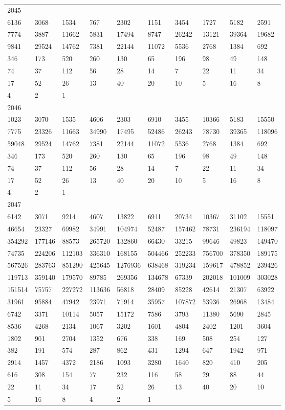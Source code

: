\begin{longtable}{*{10}{l}}
2045&&&&&&&&&\\
6136& 3068& 1534& 767& 2302& 1151& 3454& 1727& 5182& 2591\\
7774& 3887& 11662& 5831& 17494& 8747& 26242& 13121& 39364& 19682\\
9841& 29524& 14762& 7381& 22144& 11072& 5536& 2768& 1384& 692\\
346& 173& 520& 260& 130& 65& 196& 98& 49& 148\\
74& 37& 112& 56& 28& 14& 7& 22& 11& 34\\
17& 52& 26& 13& 40& 20& 10& 5& 16& 8\\
4& 2& 1& \\

2046&&&&&&&&&\\
1023& 3070& 1535& 4606& 2303& 6910& 3455& 10366& 5183& 15550\\
7775& 23326& 11663& 34990& 17495& 52486& 26243& 78730& 39365& 118096\\
59048& 29524& 14762& 7381& 22144& 11072& 5536& 2768& 1384& 692\\
346& 173& 520& 260& 130& 65& 196& 98& 49& 148\\
74& 37& 112& 56& 28& 14& 7& 22& 11& 34\\
17& 52& 26& 13& 40& 20& 10& 5& 16& 8\\
4& 2& 1& \\

2047&&&&&&&&&\\
6142& 3071& 9214& 4607& 13822& 6911& 20734& 10367& 31102& 15551\\
46654& 23327& 69982& 34991& 104974& 52487& 157462& 78731& 236194& 118097\\
354292& 177146& 88573& 265720& 132860& 66430& 33215& 99646& 49823& 149470\\
74735& 224206& 112103& 336310& 168155& 504466& 252233& 756700& 378350& 189175\\
567526& 283763& 851290& 425645& 1276936& 638468& 319234& 159617& 478852& 239426\\
119713& 359140& 179570& 89785& 269356& 134678& 67339& 202018& 101009& 303028\\
151514& 75757& 227272& 113636& 56818& 28409& 85228& 42614& 21307& 63922\\
31961& 95884& 47942& 23971& 71914& 35957& 107872& 53936& 26968& 13484\\
6742& 3371& 10114& 5057& 15172& 7586& 3793& 11380& 5690& 2845\\
8536& 4268& 2134& 1067& 3202& 1601& 4804& 2402& 1201& 3604\\
1802& 901& 2704& 1352& 676& 338& 169& 508& 254& 127\\
382& 191& 574& 287& 862& 431& 1294& 647& 1942& 971\\
2914& 1457& 4372& 2186& 1093& 3280& 1640& 820& 410& 205\\
616& 308& 154& 77& 232& 116& 58& 29& 88& 44\\
22& 11& 34& 17& 52& 26& 13& 40& 20& 10\\
5& 16& 8& 4& 2& 1& \\


\end{longtable}
